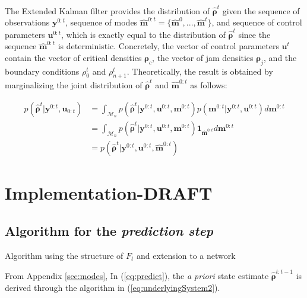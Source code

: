 \documentclass[11pt]{article}
\numberwithin{equation}{section}
\numberwithin{figure}{section}
\numberwithin{table}{section}
\begin{document}
The Extended Kalman filter provides the distribution of $\hat{\boldsymbol\rho}^{t}$ given the sequence of observations $\boldsymbol y^{0:t}$, sequence of modes $\hat{\boldsymbol m}^{0:t} = \{\hat{\boldsymbol m}^{0},...,\hat{\boldsymbol m}^{t}\}$, and sequence of control parameters $\boldsymbol u^{0:t}$, which is exactly equal to the distribution of $\hat{\boldsymbol\rho}^{t}$ since the sequence $\hat{\boldsymbol m}^{0:t}$ is deterministic. Concretely, the vector of control parameters $\boldsymbol u^{t}$ contain the vector of critical densities $\boldsymbol\rho_{c}$, the vector of jam densities $\boldsymbol\rho_{j}$, and the boundary conditions $\rho^{t}_{0}$ and $\rho^{t}_{n+1}$. Theoretically, the result is obtained by marginalizing the joint distribution of $\hat{\boldsymbol\rho}^{t}$ and $\hat{\boldsymbol m}^{0:t}$ as follows:

\begin{equation}
\begin{array}{ll}
p(\hat{\boldsymbol\rho}^{t}|\boldsymbol y^{0:t},\boldsymbol u_{0:t}) & =
\int_{\mathcal{M}_{n}} p(\hat{\boldsymbol\rho}^{t}|\boldsymbol y^{0:t},\boldsymbol u^{0:t},\boldsymbol m^{0:t})p(\boldsymbol m^{0:t}|\boldsymbol y^{0:t},\boldsymbol u^{0:t})
d\boldsymbol m^{0:t}\\ 
& = \int_{\mathcal{M}_{n}} p(\hat{\boldsymbol\rho}^{t}|\boldsymbol y^{0:t},\boldsymbol u^{0:t},\boldsymbol m^{0:t})\boldsymbol 1_{\hat{\boldsymbol m}^{0:t}}d\boldsymbol m^{0:t}\\[1ex]
& = p(\hat{\boldsymbol\rho}^{t}|\boldsymbol y^{0:t},\boldsymbol u^{0:t},\hat{\boldsymbol m}^{0:t})
\label{eq:marginalization}
\end{array}
\end{equation}

\section{Implementation-DRAFT}

\subsection{Algorithm for the \textit{prediction step}}

Algorithm using the structure of $F_{t}$ and extension to a network

From Appendix \ref{sec:modes},  In (\ref{eq:predict}), the \textit{a priori} state estimate $\hat{\boldsymbol\rho}^{t:t-1}$ is derived through the algorithm in (\ref{eq:underlyingSystem2}).
\end{document}
